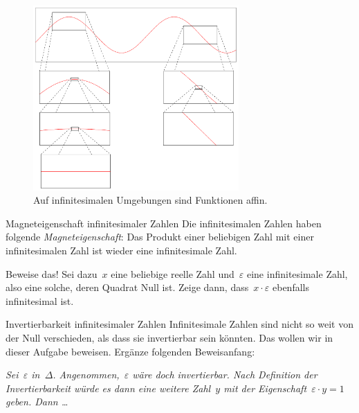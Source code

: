 \documentclass{zirkelblatt}
\theoremstyle{definition}
\theoremstyle{plain}
\theoremstyle{remark}
\begin{document}
\begin{figure}[H]
  \centering
  \includegraphics[width=0.7\textwidth]{mikroaffinitaet}
  \caption{\label{fig:mikroaffinitaet}Auf infinitesimalen Umgebungen sind Funktionen affin.}
\end{figure}

\begin{aufgabeShaded}{Magneteigenschaft infinitesimaler Zahlen}
Die infinitesimalen Zahlen haben folgende \emph{Magneteigenschaft}: Das Produkt
einer beliebigen Zahl mit einer infinitesimalen Zahl ist wieder eine
infinitesimale Zahl.

Beweise das! Sei dazu~$x$ eine beliebige reelle Zahl und~$\varepsilon$ eine
infinitesimale Zahl, also eine solche, deren Quadrat Null ist. Zeige dann,
dass~$x \cdot \varepsilon$ ebenfalls infinitesimal ist.
\end{aufgabeShaded}

\begin{aufgabeShaded}{Invertierbarkeit infinitesimaler Zahlen}
\label{aufg:invertierbarkeit}
Infinitesimale Zahlen sind nicht so weit von der Null verschieden, als dass sie
invertierbar sein könnten. Das wollen wir in dieser Aufgabe beweisen. Ergänze
folgenden Beweisanfang:

\emph{Sei~$\varepsilon$ in~$\Delta$. Angenommen,~$\varepsilon$ wäre
doch invertierbar. Nach Definition der Invertierbarkeit würde es dann eine weitere
Zahl~$y$ mit der Eigenschaft~$\varepsilon \cdot y = 1$ geben. Dann \ldots}
\end{aufgabeShaded}
\end{document}
